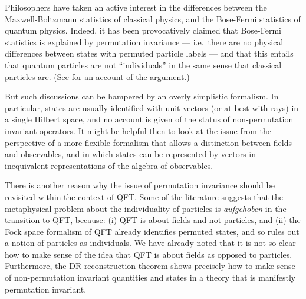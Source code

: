 \documentclass[11pt]{article}
\theoremstyle{definition}
\theoremstyle{definition}
\theoremstyle{remark}
\begin{document}
Philosophers have taken an active interest in the differences between
the Maxwell-Boltzmann statistics of classical physics, and the
Bose-Fermi statistics of quantum physics.  Indeed, it has been
provocatively claimed that Bose-Fermi statistics is explained by
permutation invariance --- i.e.\ there are no physical differences
between states with permuted particle labels --- and that this entails
that quantum particles are not ``individuals'' in the same sense that
classical particles are.  (See \cite{french2,french} for an account of
the argument.)

But such discussions can be hampered by an overly simplistic
formalism.  In particular, states are usually identified with unit
vectors (or at best with rays) in a single Hilbert space, and no
account is given of the status of non-permutation invariant operators.
It might be helpful then to look at the issue from the perspective of
a more flexible formalism that allows a distinction between fields and
observables, and in which states can be represented by vectors in
inequivalent representations of the algebra of observables.

There is another reason why the issue of permutation invariance should
be revisited within the context of QFT.  Some of the literature
suggests that the metaphysical problem about the individuality of
particles is \emph{aufgehoben} in the transition to QFT, because: (i)
QFT is about fields and not particles, and (ii) the Fock space
formalism of QFT already identifies permuted states, and so rules out
a notion of particles as individuals.  We have already noted that it
is not so clear how to make sense of the idea that QFT is about fields
as opposed to particles.  Furthermore, the DR reconstruction theorem
shows precisely how to make sense of non-permutation invariant
quantities and states in a theory that is manifestly permutation
invariant.
\end{document}
